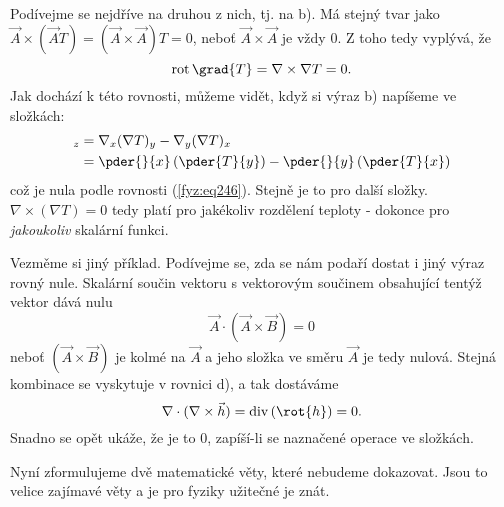       Podívejme se nejdříve na druhou z nich, tj. na b). Má stejný tvar jako 
      $\vec{A}\times(\vec{A}T)= (\vec{A}\times\vec{A})T = 0$, neboť $\vec{A}\times\vec{A}$ je 
      vždy \(0\). Z toho tedy vyplývá, že
      \begin{equation}\label{fyz:eq239}
        \mathrm{rot}\,\grad{T} = \nabla\times\nabla T = 0.
      \end{equation}
      Jak dochází k této rovnosti, můžeme vidět, když si výraz b) napíšeme ve složkách: 
      \begin{align*}
        [\nabla\times(\nabla T)]_z 
            &= \nabla_x(\nabla T)_y-\nabla_y(\nabla T)_x                                   \\
            &= \pder{}{x}\left(\pder{T}{y}\right) - \pder{}{y}\left(\pder{T}{x}\right)
      \end{align*}
      což je nula podle rovnosti (\ref{fyz:eq246}). Stejně je to pro další složky.
      \(\nabla\times(\nabla T)=0\) tedy platí pro jakékoliv rozdělení teploty - dokonce pro 
      \emph{jakoukoliv} skalární funkci.
    
      Vezměme si jiný příklad. Podívejme se, zda se nám podaří dostat i jiný výraz rovný nule. 
      Skalární součin vektoru s vektorovým součinem obsahující tentýž vektor dává nulu
      \begin{equation*}
        \vec{A}\cdot(\vec{A}\times\vec{B}) = 0
      \end{equation*}
      neboť \((\vec{A}\times\vec{B})\) je kolmé na \(\vec{A}\) a jeho složka ve směru \(\vec{A}\) je 
      tedy nulová. Stejná kombinace se vyskytuje v rovnici d), a tak dostáváme
      \begin{equation}\label{fyz:eq686}
        \nabla\cdot(\nabla\times\vec{h}) = \mathrm{div}\,(\rot{h})= 0.
      \end{equation}
      Snadno se opět ukáže, že je to \(0\), zapíší-li se naznačené operace ve složkách.
    
      Nyní zformulujeme dvě matematické věty, které nebudeme dokazovat. Jsou to velice zajímavé věty 
      a je pro fyziky užitečné je znát. 
    
